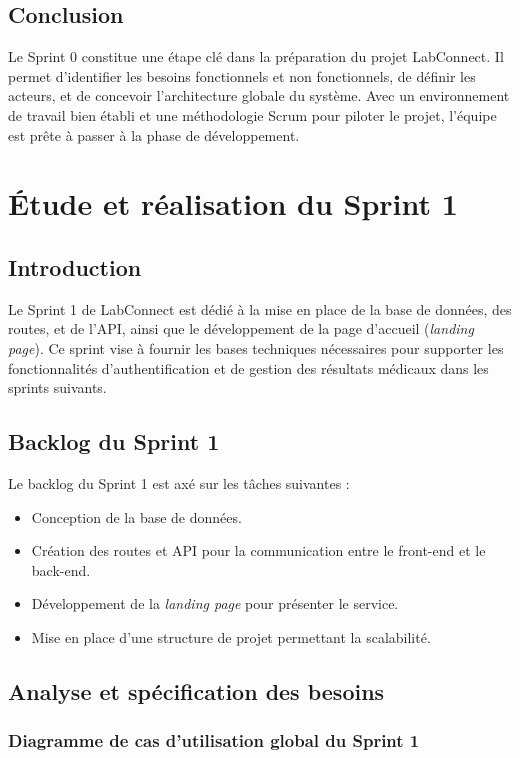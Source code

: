 \documentclass[12pt,a4paper]{report}
\begin{document}
\section{Conclusion}
Le Sprint 0 constitue une étape clé dans la préparation du projet LabConnect. Il permet d'identifier les besoins fonctionnels et non fonctionnels, de définir les acteurs, et de concevoir l'architecture globale du système. Avec un environnement de travail bien établi et une méthodologie Scrum pour piloter le projet, l'équipe est prête à passer à la phase de développement.
\chapter{Étude et réalisation du Sprint 1}

\section{Introduction}

Le Sprint 1 de LabConnect est dédié à la mise en place de la base de données, des routes, et de l’API, ainsi que le développement de la page d'accueil (\textit{landing page}). Ce sprint vise à fournir les bases techniques nécessaires pour supporter les fonctionnalités d'authentification et de gestion des résultats médicaux dans les sprints suivants.

\section{Backlog du Sprint 1}

Le backlog du Sprint 1 est axé sur les tâches suivantes :

\begin{itemize}
    \item Conception de la base de données.
    \item Création des routes et API pour la communication entre le front-end et le back-end.
    \item Développement de la \textit{landing page} pour présenter le service.
    \item Mise en place d’une structure de projet permettant la scalabilité.
\end{itemize}

\section{Analyse et spécification des besoins}

\subsection{Diagramme de cas d’utilisation global du Sprint 1}
\end{document}
